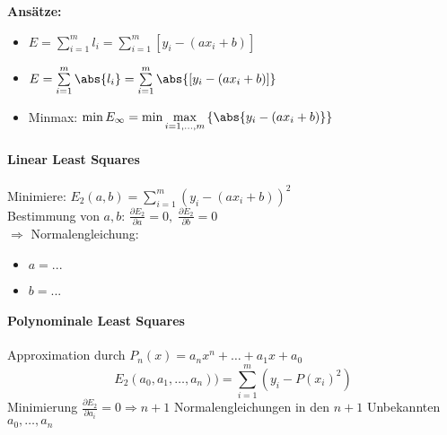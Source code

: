 \textbf{Ansätze:} 
\begin{itemize}
\item $E = \sum\limits_{i=1}^m l_i = \sum\limits_{i=1}^m\left[y_i-(ax_i+b)\right]$
\item $E = \sum\limits_{i=1}^m \abs{l_i} = \sum\limits_{i=1}^m\abs{\left[y_i-(ax_i+b)\right]}$
\item Minmax: $\min E_\infty = \min\max\limits_{i=1,\ldots,m}\left\lbrace\abs{y_i-(ax_i+b)}\right\rbrace$
\end{itemize}

\paragraph{Linear Least Squares}
Minimiere: $E_2(a,b) = \sum\limits_{i=1}^m\left(y_i-(ax_i+b)\right)^2$\\
Bestimmung von $a,b$: $\frac{\partial E_2}{\partial a} = 0,\;\frac{\partial E_2}{\partial b} = 0$\\
$\Rightarrow$ Normalengleichung:
\begin{itemize}
\item $a = ...$
\item $b = ...$
\end{itemize}

\paragraph{Polynominale Least Squares}
Approximation durch $P_n(x) = a_nx^n + \ldots + a_1x + a_0$
\begin{equation}
E_2(a_0,a_1,\ldots,a_n)) = \sum\limits_{i=1}^m(y_i - P(x_i)^2) 
\end{equation}
Minimierung $\frac{\partial E_2}{\partial a_i} = 0\Rightarrow n+1$ Normalengleichungen in den $n+1$ Unbekannten $a_0,\ldots,a_n$

